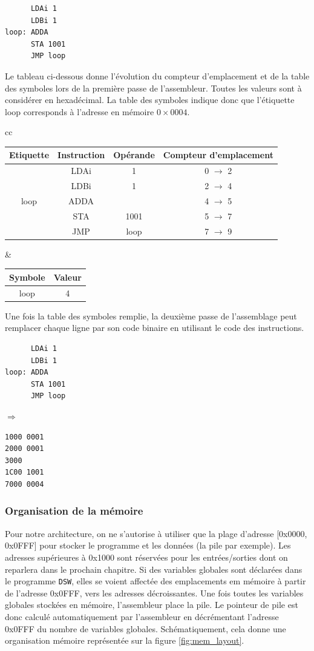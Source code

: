 \begin{verbatim}
      LDAi 1
      LDBi 1
loop: ADDA
      STA 1001
      JMP loop
\end{verbatim}

Le tableau ci-dessous donne l'évolution du compteur d'emplacement et de la table des symboles lors de la première passe de l'assembleur. Toutes les valeurs sont à considérer en hexadécimal. La table des symboles indique donc que l'étiquette loop corresponds à l'adresse en mémoire $0\times0004$.

\begin{tabular}{cc}
\begin{tabular}{c|c|c|c}
Etiquette & Instruction& Opérande & Compteur d'emplacement\\
\hline
& LDAi & 1 & 0 $\rightarrow$ 2\\
& LDBi & 1 & 2 $\rightarrow$ 4\\
loop & ADDA & & 4 $\rightarrow$ 5\\
& STA & 1001 & 5 $\rightarrow$ 7\\
& JMP & loop & 7 $\rightarrow$ 9
\end{tabular}&
\begin{tabular}{c|c}
Symbole & Valeur\\
\hline
loop & 4
\end{tabular}
\end{tabular}

Une fois la table des symboles remplie, la deuxième passe de l'assemblage peut remplacer chaque ligne par son code binaire en utilisant le code des instructions.

\begin{minipage}{0.4\linewidth}
\begin{verbatim}
      LDAi 1
      LDBi 1
loop: ADDA
      STA 1001
      JMP loop
\end{verbatim}
\end{minipage}
$\Rightarrow$
\hfill
\begin{minipage}{0.4\linewidth}
\begin{verbatim}
1000 0001
2000 0001
3000
1C00 1001
7000 0004
\end{verbatim}
\end{minipage}

\subsubsection{Organisation de la mémoire}

Pour notre architecture, on ne s'autorise à utiliser que la plage d'adresse [0x0000, 0x0FFF] pour stocker le programme et les données (la pile par exemple). Les adresses supérieures à 0x1000 sont réservées pour les entrées/sorties dont on reparlera dans le prochain chapitre. Si des variables globales sont déclarées dans le programme \texttt{DSW}, elles se voient affectée des emplacements em mémoire à partir de l'adresse 0x0FFF, vers les adresses décroissantes. Une fois toutes les variables globales stockées en mémoire, l'assembleur place la pile. Le pointeur de pile est donc calculé automatiquement par l'assembleur en décrémentant l'adresse 0x0FFF du nombre de variables globales. Schématiquement, cela donne une organisation mémoire représentée sur la figure \ref{fig:mem_layout}.

